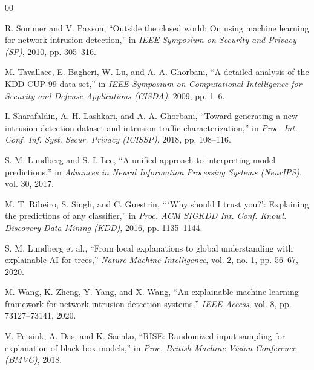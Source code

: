 \documentclass[conference]{IEEEtran}
\begin{document}

\begin{thebibliography}{00}

 R. Sommer and V. Paxson, ``Outside the closed world: On using machine learning for network intrusion detection,'' in \textit{IEEE Symposium on Security and Privacy (SP)}, 2010, pp. 305--316.

 M. Tavallaee, E. Bagheri, W. Lu, and A. A. Ghorbani, ``A detailed analysis of the KDD CUP 99 data set,'' in \textit{IEEE Symposium on Computational Intelligence for Security and Defense Applications (CISDA)}, 2009, pp. 1--6.

 I. Sharafaldin, A. H. Lashkari, and A. A. Ghorbani, ``Toward generating a new intrusion detection dataset and intrusion traffic characterization,'' in \textit{Proc. Int. Conf. Inf. Syst. Secur. Privacy (ICISSP)}, 2018, pp. 108--116.

 S. M. Lundberg and S.-I. Lee, ``A unified approach to interpreting model predictions,'' in \textit{Advances in Neural Information Processing Systems (NeurIPS)}, vol. 30, 2017.

 M. T. Ribeiro, S. Singh, and C. Guestrin, ``\,`Why should I trust you?': Explaining the predictions of any classifier,'' in \textit{Proc. ACM SIGKDD Int. Conf. Knowl. Discovery Data Mining (KDD)}, 2016, pp. 1135--1144.

 S. M. Lundberg et al., ``From local explanations to global understanding with explainable AI for trees,'' \textit{Nature Machine Intelligence}, vol. 2, no. 1, pp. 56--67, 2020.

 M. Wang, K. Zheng, Y. Yang, and X. Wang, ``An explainable machine learning framework for network intrusion detection systems,'' \textit{IEEE Access}, vol. 8, pp. 73127--73141, 2020.

 V. Petsiuk, A. Das, and K. Saenko, ``RISE: Randomized input sampling for explanation of black-box models,'' in \textit{Proc. British Machine Vision Conference (BMVC)}, 2018.

\end{thebibliography}
\end{document}

